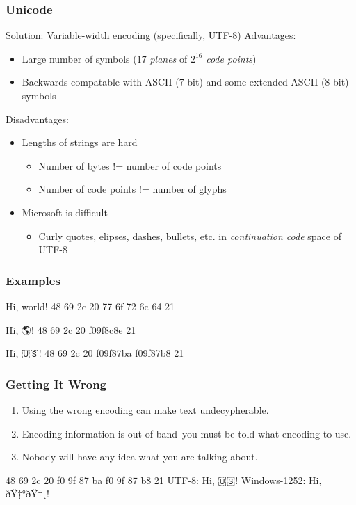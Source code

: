 \documentclass[smaller,xcolor=table,aspectratio=169]{beamer}
\begin{document}
\begin{frame}
  \frametitle{Unicode}
  Solution:  Variable-width encoding (specifically, UTF-8)
  Advantages:
  \begin{itemize}
    \item Large number of symbols ($17$ {\em planes} of $2^{16}$ {\em code points})
    \item Backwards-compatable with ASCII (7-bit) and some extended ASCII (8-bit) symbols
  \end{itemize}
  Disadvantages:
  \begin{itemize}
    \item Lengths of strings are hard
    \begin{itemize}
      \item Number of bytes != number of code points
      \item Number of code points != number of glyphs
    \end{itemize}
    \item Microsoft is difficult
    \begin{itemize}
      \item Curly quotes, elipses, dashes, bullets, etc. in {\em continuation code} space of UTF-8
    \end{itemize}
  \end{itemize}
\end{frame}

\newfontface{}
\begin{frame}
  \frametitle{Examples}
  Hi, world!
  48 69 2c 20 77 6f 72 6c 64 21

  Hi, {\emojifont 🌎}!
  48 69 2c 20 f09f8c8e 21

  Hi, {\emojifont 🇺🇸}!
  48 69 2c 20 f09f87ba f09f87b8 21
\end{frame}

\begin{frame}
  \frametitle{Getting It Wrong}
  \begin{enumerate}
    \item Using the wrong encoding can make text undecypherable.
    \item Encoding information is out-of-band--you must be told what encoding to use.
    \item Nobody will have any idea what you are talking about.
  \end{enumerate}

  48 69 2c 20 f0 9f 87 ba f0 9f 87 b8 21
  UTF-8: Hi, {\emojifont 🇺🇸}!
  Windows-1252: Hi, ðŸ‡°ðŸ‡¸!
\end{frame}
\end{document}

